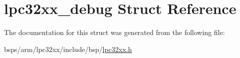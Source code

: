 \hypertarget{structlpc32xx__debug}{}\section{lpc32xx\+\_\+debug Struct Reference}
\label{structlpc32xx__debug}


The documentation for this struct was generated from the following file\+:\begin{DoxyCompactItemize}
\item 
bsps/arm/lpc32xx/include/bsp/\mbox{\hyperlink{lpc32xx_8h}{lpc32xx.\+h}}\end{DoxyCompactItemize}
